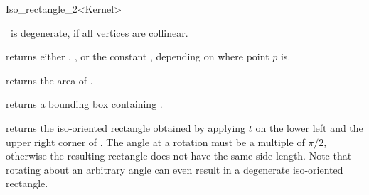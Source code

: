 \begin{ccRefClass} {Iso_rectangle_2<Kernel>}
\ccPredicates

       {%
        \ccVar\ is degenerate, if all vertices
        are collinear.}

       {returns either ,
        , or the constant
        , 
        depending on where point $p$ is.}

       {}
\ccGlue
{}
       {}
\ccGlue
{}
       {}


       {returns the area of \ccVar. }

       {returns a bounding box containing \ccVar. }

       {returns the iso-oriented rectangle obtained by applying $t$ on 
        the lower left and the upper right corner of \ccVar.
        \ccPrecond The angle at a rotation must be a multiple of $\pi/2$,
        otherwise the resulting rectangle does not have the same side length.
        Note that rotating about an arbitrary angle can even result in
        a degenerate  iso-oriented rectangle.}



\ccSeeAlso
{}

\end{ccRefClass} 

